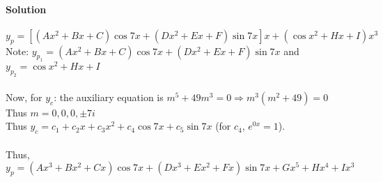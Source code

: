 \documentclass{article}
\begin{document}
\paragraph{Solution} $y_p=\left[(Ax^2+Bx+C)\cos{7x}+(Dx^2+Ex+F)\sin{7x}\right]x+\left(\cos{x^2}+Hx+I\right)x^3$
\\Note: $y_{p_1}=(Ax^2+Bx+C)\cos{7x}+(Dx^2+Ex+F)\sin{7x}$ and $y_{p_2}=\cos{x^2}+Hx+I$
\\\\Now, for $y_c$: the auxiliary equation is $m^5+49m^3=0\Rightarrow m^3(m^2+49)=0$
\\Thus $m=0,0,0,\pm7i$
\\Thus $y_c=c_1+c_2x+c_3x^2+c_4\cos{7x}+c_5\sin{7x}$ (for $c_4$, $e^{0x}=1$).
\\\\Thus, $y_p=(Ax^3+Bx^2+Cx)\cos7x+(Dx^3+Ex^2+Fx)\sin7x+Gx^5+Hx^4+Ix^3$
\end{document}
